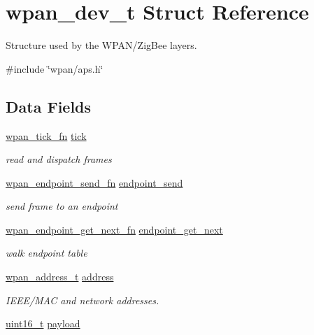 \hypertarget{structwpan__dev__t}{}\section{wpan\+\_\+dev\+\_\+t Struct Reference}
\label{structwpan__dev__t}


Structure used by the W\+P\+A\+N/\+Zig\+Bee layers.  




{\ttfamily \#include \char`\"{}wpan/aps.\+h\char`\"{}}

\subsection*{Data Fields}
\begin{DoxyCompactItemize}
\item 
\hyperlink{group__wpan__aps_gafed1542f6becf2d81fd84ef2f0ae2833}{wpan\+\_\+tick\+\_\+fn} \hyperlink{group__wpan__aps_gab472632c6a95d7856d1ea137441ec6a2}{tick}
\begin{DoxyCompactList}\small\item\em read and dispatch frames \end{DoxyCompactList}\item 
\hyperlink{group__wpan__aps_ga505477d0257efe527747c6d1f561cd6c}{wpan\+\_\+endpoint\+\_\+send\+\_\+fn} \hyperlink{group__wpan__aps_ga363ce09a97ec0b7a2dbff5b815fc3fbc}{endpoint\+\_\+send}
\begin{DoxyCompactList}\small\item\em send frame to an endpoint \end{DoxyCompactList}\item 
\hyperlink{group__wpan__aps_ga4239e4654962f88f42a53abae18e7827}{wpan\+\_\+endpoint\+\_\+get\+\_\+next\+\_\+fn} \hyperlink{group__wpan__aps_ga249b57f4a0559c0adb038f68d9b5c443}{endpoint\+\_\+get\+\_\+next}
\begin{DoxyCompactList}\small\item\em walk endpoint table \end{DoxyCompactList}\item 
\hyperlink{structwpan__address__t}{wpan\+\_\+address\+\_\+t} \hyperlink{group__wpan__aps_ga66a58a737aee9733019399e2eceabf4a}{address}
\begin{DoxyCompactList}\small\item\em I\+E\+E\+E/\+M\+AC and network addresses. \end{DoxyCompactList}\item 
\hyperlink{group__hal__dos_ga5a8b2dc9e45a9ee81a94ef304fb62505}{uint16\+\_\+t} \hyperlink{group__wpan__aps_ga27ab4ae0aba390adfd9907aeebd88b9c}{payload}

\end{DoxyCompactItemize}
